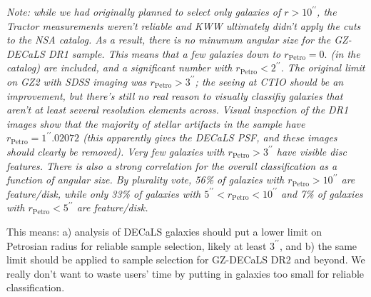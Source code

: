 \documentclass[iop,apj,tighten]{emulateapj}
\begin{document}
{\it Note: while we had originally planned to select only galaxies of $r>10^{\prime\prime}$, the Tractor measurements weren't reliable and KWW ultimately didn't apply the cuts to the NSA catalog. As a result, there is no minumum angular size for the GZ-DECaLS DR1 sample. This means that a few galaxies down to $r_\textrm{Petro}=0.$ (in the catalog) are included, and a significant number with $r_\textrm{Petro}<2^{\prime\prime}$. The original limit on GZ2 with SDSS imaging was $r_\textrm{Petro}>3^{\prime\prime}$; the seeing at CTIO should be an improvement, but there's still no real reason to visually classifiy galaxies that aren't at least several resolution elements across. Visual inspection of the DR1 images show that the majority of stellar artifacts in the sample have $r_\textrm{Petro}=1^{\prime\prime}.02072$ (this apparently gives the DECaLS PSF, and these images should clearly be removed). Very few galaxies with $r_\textrm{Petro}>3^{\prime\prime}$ have visible disc features. There is also a strong correlation for the overall classification as a function of angular size. By plurality vote, 56\% of galaxies with $r_\textrm{Petro}>10^{\prime\prime}$ are feature/disk, while only 33\% of galaxies with $5^{\prime\prime}<r_\textrm{Petro}<10^{\prime\prime}$ and 7\% of galaxies with $r_\textrm{Petro}<5^{\prime\prime}$ are feature/disk. 

This means: a) analysis of DECaLS galaxies should put a lower limit on Petrosian radius for reliable sample selection, likely at least $3^{\prime\prime}$, and b) the same limit should be applied to sample selection for GZ-DECaLS DR2 and beyond. We really don't want to waste users' time by putting in galaxies too small for reliable classification.  }





\end{document}
